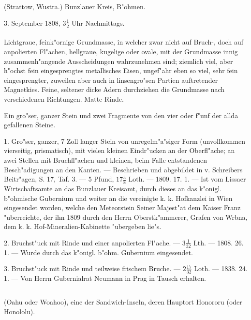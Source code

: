 \documentclass[a4paper, 11pt, oneside, polutonikogreek, german]{article}
\begin{document}
\subsection{}
\begin{center}

(Strattow, Wustra.) Bunzlauer Kreis, B"ohmen.

3. September 1808, $3\frac{1}{2}$ Uhr Nachmittags.
\end{center}
\paragraph{}
Lichtgraue, feink"ornige Grundmasse, in welcher zwar nicht auf Bruch-, doch auf anpolierten Fl"achen, hellgraue, kugelige oder ovale, mit der Grundmasse innig zusammenh"angende Ausscheidungen wahrzunehmen sind; ziemlich viel, aber h"ochst fein eingesprengtes metallisches Eisen, ungef"ahr eben so viel, sehr fein eingesprengter, zuweilen aber auch in linsengro"sen Partien auftretender Magnetkies. Feine, seltener dicke Adern durchziehen die Grundmasse nach verschiedenen Richtungen. Matte Rinde.

Ein gro"ser, ganzer Stein und zwei Fragmente von den vier oder f"unf der allda gefallenen Steine.

1. Gro"ser, ganzer, 7 Zoll langer Stein von unregelm"a"siger Form (unvollkommen vierseitig, prismatisch), mit vielen kleinen Eindr"ucken an der Oberfl"ache; an zwei Stellen mit Bruchfl"achen und kleinen, beim Falle entstandenen Besch"adigungen an den Kanten. --- Beschrieben und abgebildet in v. Schreibers Beitr"agen, S. 17, Taf. 3. --- 5 Pfund, $17\frac{5}{8}$ Loth. --- 1809. 17. 1. --- Ist vom Lissaer Wirtschaftsamte an das Bunzlauer Kreisamt, durch dieses an das k"onigl. b"ohmische Gubernium und weiter an die vereinigte k. k. Hofkanzlei in Wien eingesendet worden, welche den Meteorstein Seiner Majest"at dem Kaiser Franz "uberreichte, der ihn 1809 durch den Herrn Oberstk"ammerer, Grafen von Wrbna, dem k. k. Hof-Mineralien-Kabinette "ubergeben lie"s.

2. Bruchst"uck mit Rinde und einer anpolierten Fl"ache. --- $3\frac{1}{32}$ Lth. --- 1808. 26. 1. --- Wurde durch das k"onigl. b"ohm. Gubernium eingesendet.

3. Bruchst"uck mit Rinde und teilweise frischem Bruche. --- $2\frac{17}{32}$ Loth. --- 1838. 24. 1. --- Von Herrn Gubernialrat Neumann in Prag in Tausch erhalten.
\subsection{}
\begin{center}

(Oahu oder Woahoo), eine der Sandwich-Inseln, deren Hauptort Honororu (oder Honololu).
\end{center}
\end{document}
